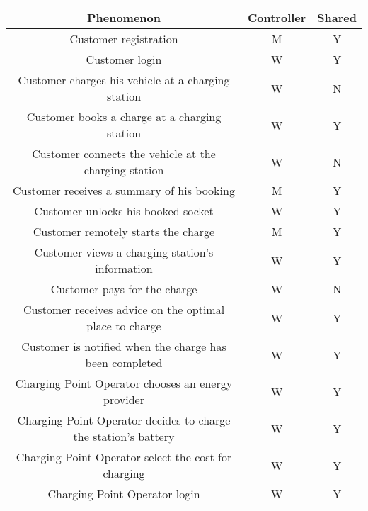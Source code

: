 \begin{table}[!h]
        \hspace{-27px}
        \begin{tabular}{|c|c|c|}
        \hline
        \textbf{Phenomenon}                                        & \textbf{Controller} & \textbf{Shared} \\ \hline
        Customer registration                                 & M          & Y      \\ \hline
        Customer login                                        & W          & Y      \\ \hline
        Customer charges his vehicle at a charging station  & W          & N      \\ \hline
        Customer books a charge at a charging station         & W          & Y      \\ \hline
        Customer connects the vehicle at the charging station              & W          & N      \\ \hline
        Customer receives a summary of his booking      & M          & Y      \\ \hline
        Customer unlocks his booked socket      & W          & Y      \\ \hline
        Customer remotely starts the charge                   & M          & Y      \\ \hline       
        Customer views a charging station's information       & W          & Y      \\ \hline
        Customer pays for the charge                          & W          & N      \\ \hline
        Customer receives advice on the optimal place to charge            & W          & Y      \\ \hline
        Customer is notified when the charge has been completed   & W          & Y      \\ \hline
        Charging Point Operator chooses an energy provider   & W          & Y      \\ \hline
        Charging Point Operator decides to charge the station's battery    & W          & Y      \\ \hline
        Charging Point Operator select the cost for charging &W          & Y      \\ \hline
        Charging Point Operator login &W          & Y      \\ \hline
       \end{tabular}
        
\end{table}


